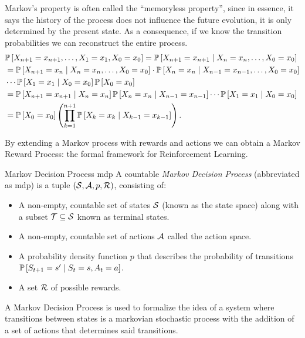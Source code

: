 Markov's property is often called the ``memoryless property'', since in essence,
it says the history of the process does not influence the future evolution, it
is only determined by the present state. As a consequence, if we know the
transition probabilities we can reconstruct the entire process.
\begin{align}
    \label{eq:markov-sequence}
    & \mathbb{P}\left[X_{n+1} = x_{n+1}, \dots, X_1 = x_1, X_0 = x_0\right] = \mathbb{P}\left[X_{n+1} = x_{n+1} \mid X_n = x_n, \dots, X_0 = x_0\right] \nonumber \\
    &= \mathbb{P}\left[X_{n+1} = x_n \mid X_{n} = x_n, \dots, X_0 = x_0\right] \cdot \mathbb{P}\left[X_n = x_n \mid X_{n-1} = x_{n-1}, \dots, X_0 = x_0\right] \nonumber \\
    &\cdots \mathbb{P}\left[X_1 = x_1 \mid X_0 = x_0\right] \mathbb{P}\left[X_0 = x_0\right] \nonumber \\
    &= \mathbb{P}\left[X_{n+1} = x_{n+1} \mid X_n = x_n\right] \mathbb{P}\left[X_n = x_n \mid X_{n-1} = x_{n-1}\right] \cdots \mathbb{P}\left[X_1 = x_1 \mid X_0 = x_0\right] \nonumber \\
    &= \mathbb{P}\left[X_0 = x_0\right] \left( \prod_{k=1}^{n+1} \mathbb{P}\left[X_k = x_k \mid X_{k-1} = x_{k-1}\right] \right).
\end{align}

By extending a Markov process with rewards and actions we can obtain a Markov
Reward Process: the formal framework for Reinforcement Learning.

\begin{dfn}{Markov Decision Process \cite[Lec.~2]{silver2015}}{\ac{mdp}}
    A countable \emph{Markov Decision Process} (abbreviated as \ac{mdp}) is a tuple
    $(\mathcal{S}, \mathcal{A}, p, \mathcal{R})$, consisting of:
    \begin{itemize}
        \item A non-empty, countable set of states $\mathcal{S}$ (known as the state
            space) along with a subset $\mathcal{T} \subseteq \mathcal{S}$ known as
            terminal states. 
        \item A non-empty, countable set of actions $\mathcal{A}$ called the action
            space.
        \item A probability density function $p$ that describes the probability
            of transitions $\mathbb{P}\left[S_{t+1} = s' \mid S_t = s, A_t = a\right]$.
        \item A set $\mathcal{R}$ of possible rewards.
    \end{itemize}
\end{dfn}

A Markov Decision Process is used to formalize the idea of a system where
transitions between states is a markovian stochastic process with the addition
of a set of actions that determines said transitions. 